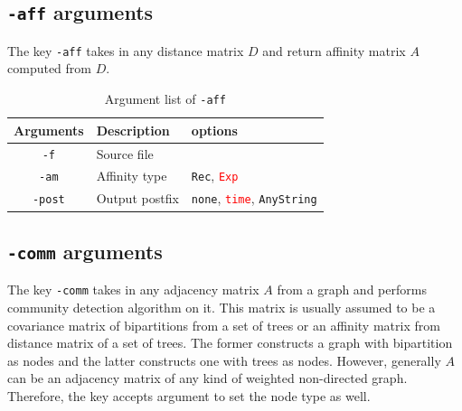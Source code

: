 \documentclass[11pt,a4paper]{article}
\theoremstyle{definition}
\theoremstyle{definition}
\numberwithin{equation}{section}
\begin{document}
	\clearpage
	
	\subsection{\texttt{-aff} arguments}
	
	The key \texttt{-aff} takes in any distance matrix $D$ and return affinity matrix $A$ computed from $D$.
	
	
	\begin{table}[!h]
		\centering
		\begin{tabular}{cll}
			\hline
			Arguments & Description & options\\
			\hline
			\texttt{-f}& Source file &  \\
			\hline
			\texttt{-am}& Affinity type & \texttt{Rec}, \textcolor{red}{\texttt{Exp}}\\
			\hline
			\texttt{-post} & Output postfix&\texttt{none}, \textcolor{red}{\texttt{time}}, \texttt{AnyString}\\
			\hline
		\end{tabular}
		\caption{Argument list of \texttt{-aff}}
		\label{tab:aff}
	\end{table}
	
	\subsection{\texttt{-comm} arguments}
	
	The key \texttt{-comm} takes in any adjacency matrix $A$ from a graph and performs community detection algorithm on it. This matrix is usually assumed to be a covariance matrix of bipartitions from a set of trees or an affinity matrix from distance matrix of a set of trees. The former constructs a graph with bipartition as nodes and the latter constructs one with trees as nodes. However, generally $A$ can be an adjacency matrix of any kind of weighted non-directed graph. Therefore, the key accepts argument to set the node type as well.
	
\end{document}
